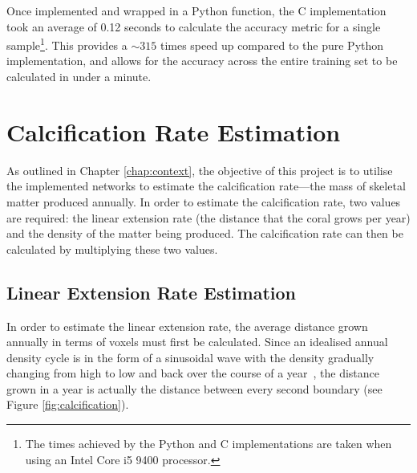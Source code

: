 Once implemented and wrapped in a Python function, the C implementation took an average of 0.12 seconds to calculate the accuracy metric for a single sample\footnote{The times achieved by the Python and C implementations are taken when using an Intel Core i5 9400 processor.}. This provides a ${\sim}315$ times speed up compared to the pure Python implementation, and allows for the accuracy across the entire training set to be calculated in under a minute.

\section{Calcification Rate Estimation}
\label{sec:calcificationimplementation}

As outlined in Chapter \ref{chap:context}, the objective of this project is to utilise the implemented networks to estimate the calcification rate---the mass of skeletal matter produced annually. In order to estimate the calcification rate, two values are required: the linear extension rate (the distance that the coral grows per year) and the density of the matter being produced. The calcification rate can then be calculated by multiplying these two values.

\subsection{Linear Extension Rate Estimation}

In order to estimate the linear extension rate, the average distance grown annually in terms of voxels must first be calculated. Since an idealised annual density cycle is in the form of a sinusoidal wave with the density gradually changing from high to low and back over the course of a year~\cite[p. 39]{coralsine}, the distance grown in a year is actually the distance between every second boundary (see Figure \ref{fig:calcification}).

